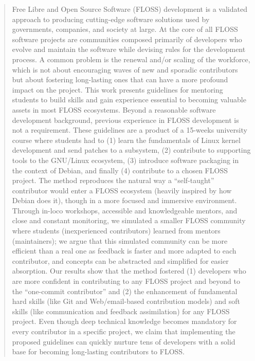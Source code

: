 \documentclass[conference]{IEEEtran}
\begin{document}
{\begin{abstract}
  Free Libre and Open Source Software (FLOSS) development is a validated
  approach to producing cutting-edge software solutions used by governments,
  companies, and society at large. At the core of all FLOSS software projects
  are communities composed primarily of developers who evolve and maintain the
  software while devising rules for the development process. A common problem is
  the renewal and/or scaling of the workforce, which is not about encouraging
  waves of new and sporadic contributors but about fostering long-lasting ones
  that can have a more profound impact on the project. This work presents
  guidelines for mentoring students to build skills and gain experience
  essential to becoming valuable assets in most FLOSS ecosystems. Beyond a
  reasonable software development background, previous experience in FLOSS
  development is not a requirement. These guidelines are a product of a 15-weeks
  university course where students had to (1) learn the fundamentals of Linux
  kernel development and send patches to a subsystem, (2) contribute to
  supporting tools to the GNU/Linux ecosystem, (3) introduce software packaging
  in the context of Debian, and finally (4) contribute to a chosen FLOSS
  project. The method reproduces the natural way a “self-taught” contributor
  would enter a FLOSS ecosystem (heavily inspired by how Debian does it), though
  in a more focused and immersive environment. Through in-loco workshops,
  accessible and knowledgeable mentors, and close and constant monitoring, we
  simulated a smaller FLOSS community where students (inexperienced
  contributors) learned from mentors (maintainers); we argue that this simulated
  community can be more efficient than a real one as feedback is faster and more
  adapted to each contributor, and concepts can be abstracted and simplified for
  easier absorption. Our results show that the method fostered (1) developers
  who are more confident in contributing to any FLOSS project and beyond to the
  “one-commit contributor” and (2) the enhancement of fundamental hard skills
  (like Git and Web/email-based contribution models) and soft skills (like
  communication and feedback assimilation) for any FLOSS project. Even though
  deep technical knowledge becomes mandatory for every contributor in a specific
  project, we claim that implementing the proposed guidelines can quickly
  nurture tens of developers with a solid base for becoming long-lasting
  contributors to FLOSS.
\end{abstract}


}
\end{document}
